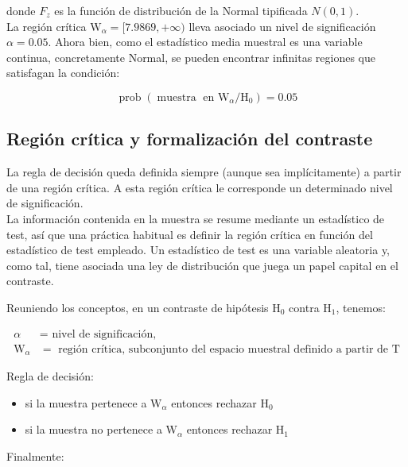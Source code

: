 \documentclass[
]{article}
\providecommand{\tightlist}{%
  \setlength{\itemsep}{0pt}\setlength{\parskip}{0pt}}
\begin{document}
donde \(F_{z}\) es la función de distribución de la Normal tipificada \(N(0,1)\).\\
La región crítica \(\mathrm{W}_{\alpha}=[7.9869,+\infty)\) lleva asociado un nivel de significación \(\alpha=0.05\). Ahora bien, como el estadístico media muestral es una variable continua, concretamente Normal, se pueden encontrar infinitas regiones que satisfagan la condición:

\[
\operatorname{prob}\left(\operatorname{muestra} \text { en } \mathrm{W}_{\alpha} / \mathrm{H}_{0}\right)=0.05
\]

\subsection{Región crítica y formalización del contraste}\label{regiuxf3n-cruxedtica-y-formalizaciuxf3n-del-contraste}

La regla de decisión queda definida siempre (aunque sea implícitamente) a partir de una región crítica. A esta región crítica le corresponde un determinado nivel de significación.\\
La información contenida en la muestra se resume mediante un estadístico de test, así que una práctica habitual es definir la región crítica en función del estadístico de test empleado. Un estadístico de test es una variable aleatoria y, como tal, tiene asociada una ley de distribución que juega un papel capital en el contraste.

Reuniendo los conceptos, en un contraste de hipótesis \(\mathrm{H}_{0}\) contra \(\mathrm{H}_{1}\), tenemos:

\[
\begin{aligned}
\alpha & =\text { nivel de significación, } \\
\mathrm{W}_{\alpha} & =\text { región crítica, subconjunto del espacio muestral definido a partir de } \mathrm{T}
\end{aligned}
\]

Regla de decisión:

\begin{itemize}
\tightlist
\item
  si la muestra pertenece a \(\mathrm{W}_{\alpha}\) entonces rechazar \(\mathrm{H}_{0}\)\\
\item
  si la muestra no pertenece a \(\mathrm{W}_{\alpha}\) entonces rechazar \(\mathrm{H}_{1}\)
\end{itemize}

Finalmente:
\end{document}

